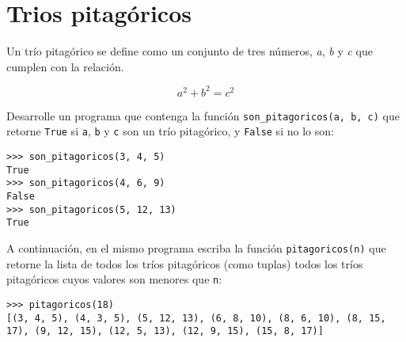 \section{Trios pitagóricos}

Un trío pitagórico se define como un conjunto de tres números, \emph{a},
\emph{b} y \emph{c} que cumplen con la relación.

\[a^{2} + b^{2} = c^{2}\]

Desarrolle un programa que contenga la función
\lstinline!son_pitagoricos(a, b, c)! que retorne \lstinline!True! si
\lstinline!a!, \lstinline!b! y \lstinline!c! son un trío pitagórico, y
\lstinline!False! si no lo son:

\begin{lstlisting}
>>> son_pitagoricos(3, 4, 5)
True
>>> son_pitagoricos(4, 6, 9)
False
>>> son_pitagoricos(5, 12, 13)
True
\end{lstlisting}

A continuación, en el mismo programa escriba la función
\lstinline!pitagoricos(n)! que retorne la lista de todos los tríos
pitagóricos (como tuplas) todos los tríos pitagóricos cuyos valores son
menores que \lstinline!n!:

\begin{lstlisting}
>>> pitagoricos(18)
[(3, 4, 5), (4, 3, 5), (5, 12, 13), (6, 8, 10), (8, 6, 10), (8, 15, 17), (9, 12, 15), (12, 5, 13), (12, 9, 15), (15, 8, 17)]
\end{lstlisting}

